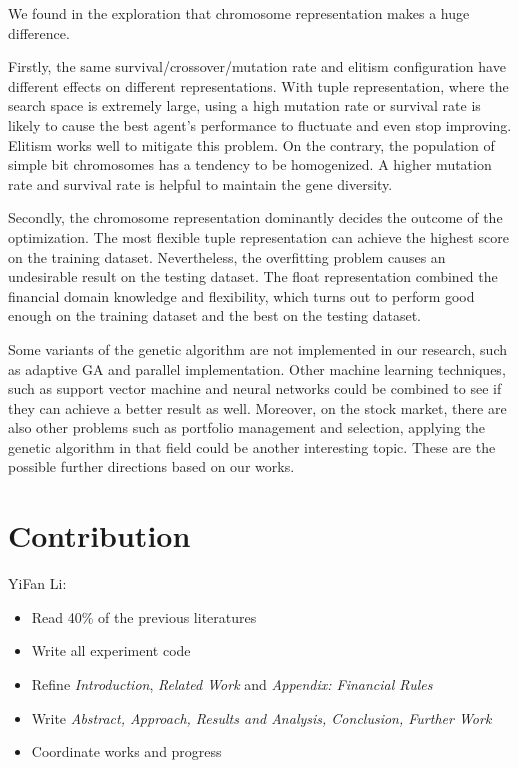 \documentclass{article}
\begin{document}
We found in the exploration that chromosome representation makes a huge difference.

Firstly, the same survival/crossover/mutation rate and elitism configuration have
different effects on different representations.
With tuple representation, where the search space is extremely large,
using a high mutation rate or survival rate is likely to cause the best agent's performance to fluctuate
and even stop improving.
Elitism works well to mitigate this problem.
On the contrary, the population of simple bit chromosomes has a tendency to be homogenized.
A higher mutation rate and survival rate is helpful to maintain the gene diversity.

Secondly, the chromosome representation dominantly decides the outcome of the optimization.
The most flexible tuple representation can achieve the highest score on the training dataset.
Nevertheless, the overfitting problem causes an undesirable result on the testing dataset.
The float representation combined the financial domain knowledge and flexibility,
which turns out to perform good enough on the training dataset and the best on the testing dataset.

Some variants of the genetic algorithm are not implemented in our research,
such as adaptive GA and parallel implementation.
Other machine learning techniques, such as support vector machine and neural networks
could be combined to see if they can achieve a better result as well.
Moreover, on the stock market, there are also other problems such as portfolio management and selection,
applying the genetic algorithm in that field could be another interesting topic.
These are the possible further directions based on our works.


\section{Contribution}

YiFan Li:

\begin{itemize}
    \item Read 40\% of the previous literatures
    \item Write all experiment code
    \item Refine \textit{Introduction}, \textit{Related Work} and \textit{Appendix: Financial Rules}
    \item Write \textit{Abstract, Approach, Results and Analysis, Conclusion, Further Work}
    \item Coordinate works and progress
\end{itemize}
\end{document}
